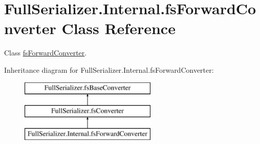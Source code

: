 \hypertarget{class_full_serializer_1_1_internal_1_1fs_forward_converter}{}\section{Full\+Serializer.\+Internal.\+fs\+Forward\+Converter Class Reference}
\label{class_full_serializer_1_1_internal_1_1fs_forward_converter}


Class \hyperlink{class_full_serializer_1_1_internal_1_1fs_forward_converter}{fs\+Forward\+Converter}.  


Inheritance diagram for Full\+Serializer.\+Internal.\+fs\+Forward\+Converter\+:\begin{figure}[H]
\begin{center}
\leavevmode
\includegraphics[height=3.000000cm]{class_full_serializer_1_1_internal_1_1fs_forward_converter}
\end{center}
\end{figure}
